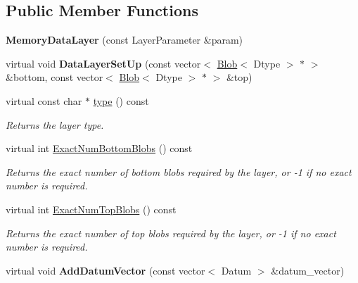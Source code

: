 \subsection*{Public Member Functions}
\begin{DoxyCompactItemize}
\item 
{\bfseries Memory\+Data\+Layer} (const Layer\+Parameter \&param)\hypertarget{classcaffe_1_1MemoryDataLayer_a9bf012786068bfe846694af129a6736f}{}\label{classcaffe_1_1MemoryDataLayer_a9bf012786068bfe846694af129a6736f}

\item 
virtual void {\bfseries Data\+Layer\+Set\+Up} (const vector$<$ \hyperlink{classcaffe_1_1Blob}{Blob}$<$ Dtype $>$ $\ast$ $>$ \&bottom, const vector$<$ \hyperlink{classcaffe_1_1Blob}{Blob}$<$ Dtype $>$ $\ast$ $>$ \&top)\hypertarget{classcaffe_1_1MemoryDataLayer_a34d6d4a496648d6209999f6004df08e3}{}\label{classcaffe_1_1MemoryDataLayer_a34d6d4a496648d6209999f6004df08e3}

\item 
virtual const char $\ast$ \hyperlink{classcaffe_1_1MemoryDataLayer_a52298f383fa52ccf0c61e54f46ba9cda}{type} () const \hypertarget{classcaffe_1_1MemoryDataLayer_a52298f383fa52ccf0c61e54f46ba9cda}{}\label{classcaffe_1_1MemoryDataLayer_a52298f383fa52ccf0c61e54f46ba9cda}

\begin{DoxyCompactList}\small\item\em Returns the layer type. \end{DoxyCompactList}\item 
virtual int \hyperlink{classcaffe_1_1MemoryDataLayer_a46529bcce2bf8b8f3984286ad675cbd6}{Exact\+Num\+Bottom\+Blobs} () const 
\begin{DoxyCompactList}\small\item\em Returns the exact number of bottom blobs required by the layer, or -\/1 if no exact number is required. \end{DoxyCompactList}\item 
virtual int \hyperlink{classcaffe_1_1MemoryDataLayer_a973a58b5967809488f0e88c0a9a6fbac}{Exact\+Num\+Top\+Blobs} () const 
\begin{DoxyCompactList}\small\item\em Returns the exact number of top blobs required by the layer, or -\/1 if no exact number is required. \end{DoxyCompactList}\item 
virtual void {\bfseries Add\+Datum\+Vector} (const vector$<$ Datum $>$ \&datum\+\_\+vector)\hypertarget{classcaffe_1_1MemoryDataLayer_a5d7c633d066570d2b040ccabda9d9f60}{}\label{classcaffe_1_1MemoryDataLayer_a5d7c633d066570d2b040ccabda9d9f60}


\end{DoxyCompactItemize}
